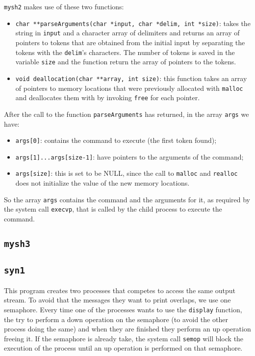 \texttt{mysh2} makes use of these two functions:
\begin{itemize}
\item{\texttt{char **parseArguments(char *input, char *delim, int *size)}}: takes the string in \texttt{input} and a character array of delimiters and returns an array of pointers to tokens that are obtained from the initial input by separating the tokens with the \texttt{delim}'s characters. The number of tokens is saved in the variable \texttt{size} and the function return the array of pointers to the tokens.
\item{\texttt{void deallocation(char **array, int size)}}: this function takes an array of pointers to memory locations that were previously allocated with \texttt{malloc} and deallocates them with by invoking \texttt{free} for each pointer.
\end{itemize}

After the call to the function \texttt{parseArguments} has returned, in the array \texttt{args} we have:
\begin{itemize}
\item \texttt{args[0]}: contains the command to execute (the first token found);
\item \texttt{args[1]...args[size-1]}: have pointers to the arguments of the command;
\item \texttt{args[size]}: this is set to be NULL, since the call to \texttt{malloc} and \texttt{realloc} does not initialize the value of the new memory locations.
\end{itemize}

So the array \texttt{args} contains the command and the arguments for it, as required by the system call \texttt{execvp}, that is called by the child process to execute the command.

\subsection{\texttt{mysh3}}
\subsection{\texttt{syn1}}
This program creates two processes that competes to access the same output stream. To avoid that the messages they want to print overlaps, we use one semaphore. Every time one of the processes wants to use the \texttt{display} function, the try to perform a down operation on the semaphore (to avoid the other process doing the same) and when they are finished they perform an up operation freeing it. If the semaphore is already take, the system call \texttt{semop} will block the execution of the process until an up operation is performed on that semaphore.

